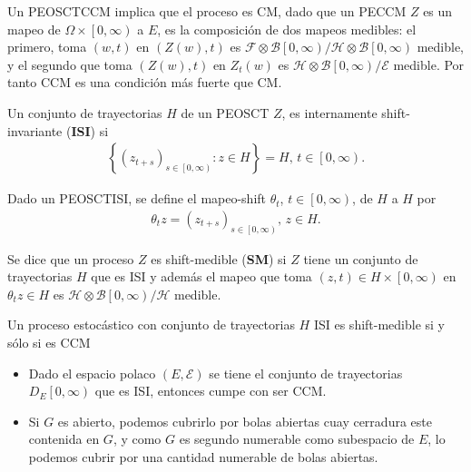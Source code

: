 \begin{Note}
Un PEOSCTCCM implica que el proceso es CM, dado que un PECCM $Z$ es un mapeo de $\Omega\times\left[0,\infty\right)$ a $E$, es la composici\'on de dos mapeos medibles: el primero, toma $\left(w,t\right)$ en $\left(Z\left(w\right),t\right)$ es $\mathcal{F}\otimes\mathcal{B}\left[0,\infty\right)/\mathcal{H}\otimes\mathcal{B}\left[0,\infty\right)$ medible, y el segundo que toma $\left(Z\left(w\right),t\right)$  en $Z_{t}\left(w\right)$ es $\mathcal{H}\otimes\mathcal{B}\left[0,\infty\right)/\mathcal{E}$ medible. Por tanto CCM es una condici\'on m\'as fuerte que CM.
\end{Note}

\begin{Def}
Un conjunto de trayectorias $H$ de un PEOSCT $Z$, es internamente shift-invariante (\textbf{ISI}) si 
\begin{eqnarray*}
\left\{\left(z_{t+s}\right)_{s\in\left[0,\infty\right)}:z\in H\right\}=H\textrm{, }t\in\left[0,\infty\right).
\end{eqnarray*}
\end{Def}


\begin{Def}
Dado un PEOSCTISI, se define el mapeo-shift $\theta_{t}$, $t\in\left[0,\infty\right)$, de $H$ a $H$ por 
\begin{eqnarray*}
\theta_{t}z=\left(z_{t+s}\right)_{s\in\left[0,\infty\right)}\textrm{, }z\in H.
\end{eqnarray*}
\end{Def}

\begin{Def}
Se dice que un proceso $Z$ es shift-medible (\textbf{SM}) si $Z$ tiene un conjunto de trayectorias $H$ que es ISI y adem\'as el mapeo que toma $\left(z,t\right)\in H\times\left[0,\infty\right)$ en $\theta_{t}z\in H$ es $\mathcal{H}\otimes\mathcal{B}\left[0,\infty\right)/\mathcal{H}$ medible.
\end{Def}

\begin{Note}
Un proceso estoc\'astico con conjunto de trayectorias $H$ ISI es shift-medible si y s\'olo si es CCM
\end{Note}

\begin{Note}
\begin{itemize}
\item Dado el espacio polaco $\left(E,\mathcal{E}\right)$ se tiene el  conjunto de trayectorias $D_{E}\left[0,\infty\right)$ que es ISI, entonces cumpe con ser CCM.

\item Si $G$ es abierto, podemos cubrirlo por bolas abiertas cuay cerradura este contenida en $G$, y como $G$ es segundo numerable como subespacio de $E$, lo podemos cubrir por una cantidad numerable de bolas abiertas.

\end{itemize}
\end{Note}


